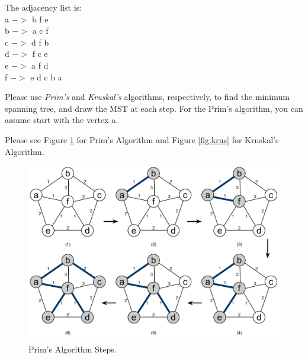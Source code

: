 \documentclass{article}
\begin{document}
\begin{enumerate}
The adjacency list is: \\
a $->$ b f e\\
b $->$ a c f\\
c $->$ d f b\\
d $->$ f c e\\
e $->$ a f d\\
f $->$ e d c b a

Please use {\it Prim's} and {\it Kruskal's} algorithms, respectively,
to find the minimum spanning tree, and draw the MST at each step. For
the Prim's algorithm, you can assume start with the vertex a. 

Please see Figure \ref{fig:prim} for Prim's Algorithm and Figure
\ref{fig:krus} for Kruskal's Algorithm.

\begin{figure}[H]
  \vspace{-10pt}
  \begin{center}
    \includegraphics[scale=0.4]{prims_algorithm}
    \caption{Prim's Algorithm Steps.\label{fig:prim}}
  \end{center}
  \vspace{-20pt}
\end{figure}


\end{enumerate}
\end{document}
